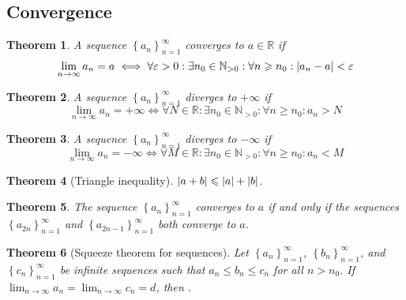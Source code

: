 \documentclass{article}
\newcommand*{\N}{\mathbb{N}}
\newcommand*{\R}{\mathbb{R}}
\theoremstyle{plain}
\newtheorem{theorem}{Theorem}[section]
\numberwithin{theorem}{subsection}
\theoremstyle{definition}
\numberwithin{definition}{subsection}
\theoremstyle{remark}
\numberwithin{note}{subsection}
\begin{document}
\subsection{Convergence}
\begin{theorem}
	A sequence $\left\{a_n\right\}_{n=1}^\infty$ converges to $a\in \R$ if
	\begin{equation*}
		\lim_{n \to \infty}a_n = a \iff \forall \varepsilon > 0 : \exists n_0 \in \N_{> 0}:\forall n \geqslant n_0 : \abs{a_n - a} < \varepsilon
	\end{equation*}
\end{theorem}
%
\begin{theorem}
	A sequence $\left\{a_n\right\}_{n=1}^\infty$ diverges to $+\infty$ if
	\begin{equation*}
		\lim_{n \to \infty}a_n = +\infty \iff \forall N \in \R : \exists n_0 \in \N_{> 0}:\forall n \geqslant n_0 : a_n > N
	\end{equation*}
\end{theorem}
%
\begin{theorem}
	A sequence $\left\{a_n\right\}_{n=1}^\infty$ diverges to $-\infty$ if
	\begin{equation*}
		\lim_{n \to \infty}a_n = -\infty \iff \forall M \in \R : \exists n_0 \in \N_{> 0}:\forall n \geqslant n_0 : a_n < M
	\end{equation*}
\end{theorem}
%
\begin{theorem}[Triangle inequality]
	$\abs{a+b}\leqslant\abs{a}+\abs{b}$.
\end{theorem}
%
\begin{theorem}
	The sequence $\left\{ a_n \right\}_{n=1}^\infty$ converges to $a$ if and only if the sequences $\left\{ a_{2n} \right\}_{n=1}^\infty$ and $\left\{ a_{2n-1} \right\}_{n=1}^\infty$ both converge to $a$.
\end{theorem}
%
\begin{theorem}[Squeeze theorem for sequences]
	Let $\left\{ a_n \right\}_{n=1}^\infty$, $\left\{ b_n \right\}_{n=1}^\infty$, and $\left\{ c_n \right\}_{n=1}^\infty$ be infinite sequences such that $a_n \leqslant b_n \leqslant c_n$ for all $n>n_0$. If $\lim_{n\to\infty}a_n=\lim_{n\to\infty}c_n=d$, then .
\end{theorem}
%
\end{document}
